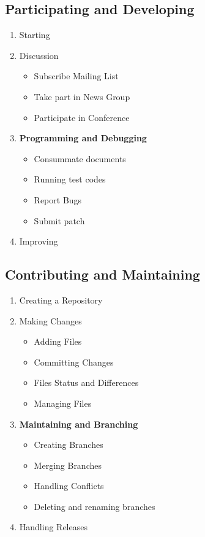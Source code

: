 \documentclass[draftclsnofoot,journal,onecolumn,12pt]{IEEEtran}
\begin{document}
\subsection{Participating and Developing}
\begin{enumerate}
  \item Starting
  \item Discussion
  \begin{itemize}
    \item Subscribe Mailing List
    \item Take part in News Group
    \item Participate in Conference
  \end{itemize}
  \item \textbf{Programming and Debugging}
  \begin{itemize}
    \item Consummate documents
    \item Running test codes
    \item Report Bugs
    \item Submit patch
  \end{itemize}
  \item Improving
\end{enumerate}

\subsection{Contributing and Maintaining}

\begin{enumerate}
  \item Creating a Repository
  \item Making Changes
  \begin{itemize}
    \item Adding Files
    \item Committing Changes
    \item Files Status and Differences
    \item Managing Files
  \end{itemize}
  \item \textbf{Maintaining and Branching}
  \begin{itemize}
    \item Creating Branches
    \item Merging Branches
    \item Handling Conflicts
    \item Deleting and renaming branches
\end{itemize}
  \item Handling Releases
\end{enumerate}
\end{document}

